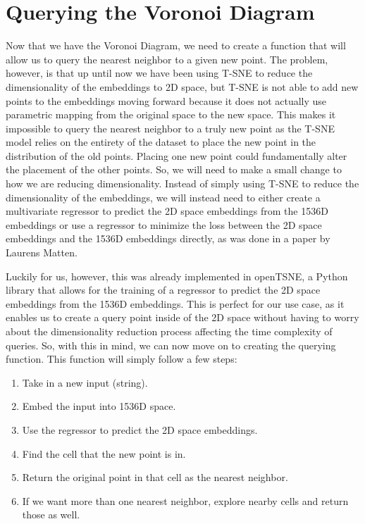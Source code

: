 \documentclass{article}
\begin{document}
\section{Querying the Voronoi Diagram}
Now that we have the Voronoi Diagram, we need to create a function that will allow us to query the nearest neighbor to a given new point. 
The problem, however, is that up until now we have been using T-SNE to reduce the dimensionality of the embeddings to 2D space, but T-SNE is not able to add new points to the embeddings moving forward because it does not actually use parametric mapping from the original space to the new space. This makes it impossible to query the nearest neighbor to a truly new point as the T-SNE model relies on the entirety of the dataset to place the new point in the distribution of the old points. Placing one new point could fundamentally alter the placement of the other points. So, we will need to make a small change to how we are reducing dimensionality. Instead of simply using T-SNE to reduce the dimensionality of the embeddings, we will instead need to either create a multivariate regressor to predict the 2D space embeddings from the 1536D embeddings or use a regressor to minimize the loss between the 2D space embeddings and the 1536D embeddings directly, as was done in a paper by Laurens Matten\cite{laurensMaaten2009}.
\newline

\noindent
Luckily for us, however, this was already implemented in openTSNE, a Python library that allows for the training of a regressor to predict the 2D space embeddings from the 1536D embeddings\cite{openTSNE}. This is perfect for our use case, as it enables us to create a query point inside of the 2D space without having to worry about the dimensionality reduction process affecting the time complexity of queries. So, with this in mind, we can now move on to creating the querying function. This function will simply follow a few steps:

\begin{enumerate}
    \item Take in a new input (string).
    \item Embed the input into 1536D space.
    \item Use the regressor to predict the 2D space embeddings.
    \item Find the cell that the new point is in.
    \item Return the original point in that cell as the nearest neighbor.
    \item If we want more than one nearest neighbor, explore nearby cells and return those as well.
\end{enumerate}
\end{document}
